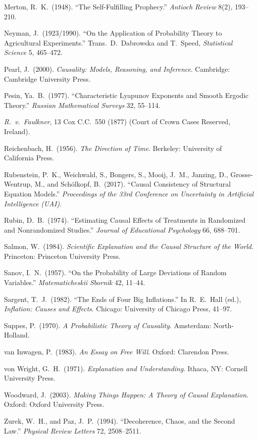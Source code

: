 \documentclass[11pt]{article}
\theoremstyle{definition}
\newenvironment{refs}{%
  \begin{list}{}{%
    \setlength{\leftmargin}{1.6em}%
    \setlength{\itemindent}{-1.6em}%
    \setlength{\itemsep}{0.35em}%
    \setlength{\parsep}{0pt}%
  }}
  {\end{list}}
\begin{document}
\begin{refs}
\item Merton, R.\ K.\ (1948). ``The Self-Fulfilling Prophecy.'' \emph{Antioch Review} 8(2), 193--210.
\item Neyman, J.\ (1923/1990). ``On the Application of Probability Theory to Agricultural Experiments.'' Trans.\ D.\ Dabrowska and T.\ Speed, \emph{Statistical Science} 5, 465--472.
\item Pearl, J.\ (2000). \emph{Causality: Models, Reasoning, and Inference}. Cambridge: Cambridge University Press.
\item Pesin, Ya.\ B.\ (1977). ``Characteristic Lyapunov Exponents and Smooth Ergodic Theory.'' \emph{Russian Mathematical Surveys} 32, 55--114.
\item \emph{R.\ v.\ Faulkner}, 13 Cox C.C.\ 550 (1877) (Court of Crown Cases Reserved, Ireland).
\item Reichenbach, H.\ (1956). \emph{The Direction of Time}. Berkeley: University of California Press.
\item Rubenstein, P.\ K., Weichwald, S., Bongers, S., Mooij, J.\ M., Janzing, D., Grosse-Wentrup, M., and Sch\"olkopf, B.\ (2017). ``Causal Consistency of Structural Equation Models.'' \emph{Proceedings of the 33rd Conference on Uncertainty in Artificial Intelligence (UAI)}.
\item Rubin, D.\ B.\ (1974). ``Estimating Causal Effects of Treatments in Randomized and Nonrandomized Studies.'' \emph{Journal of Educational Psychology} 66, 688--701.
\item Salmon, W.\ (1984). \emph{Scientific Explanation and the Causal Structure of the World}. Princeton: Princeton University Press.
\item Sanov, I.\ N.\ (1957). ``On the Probability of Large Deviations of Random Variables.'' \emph{Matematicheskii Sbornik} 42, 11--44.
\item Sargent, T.\ J.\ (1982). ``The Ends of Four Big Inflations.'' In R.\ E.\ Hall (ed.), \emph{Inflation: Causes and Effects}. Chicago: University of Chicago Press, 41--97.
\item Suppes, P.\ (1970). \emph{A Probabilistic Theory of Causality}. Amsterdam: North-Holland.
\item van Inwagen, P.\ (1983). \emph{An Essay on Free Will}. Oxford: Clarendon Press.
\item von Wright, G.\ H.\ (1971). \emph{Explanation and Understanding}. Ithaca, NY: Cornell University Press.
\item Woodward, J.\ (2003). \emph{Making Things Happen: A Theory of Causal Explanation}. Oxford: Oxford University Press.
\item Zurek, W.\ H., and Paz, J.\ P.\ (1994). ``Decoherence, Chaos, and the Second Law.'' \emph{Physical Review Letters} 72, 2508--2511.
\end{refs}
\end{document}
